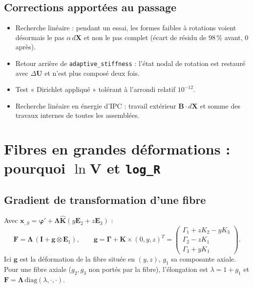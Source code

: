 \documentclass[11pt,a4paper]{article}
\newcommand{\hatv}[1]{\widehat{\bm{#1}}}
\newcommand{\Lam}{\bm{\Lambda}}
\newcommand{\Gam}{\bm{\Gamma}}
\newcommand{\Kv}{\mathbf{K}}
\newcommand{\code}[1]{\texttt{#1}}
\begin{document}
\subsection{Corrections apportées au passage}
\begin{itemize}
\item Recherche linéaire : pendant un essai, les formes faibles à rotations
voient désormais le pas $\alpha\,d\mathbf X$ et non le pas complet
(écart de résidu de 98\,\% avant, 0 après).
\item Retour arrière de \code{adaptive\_stiffness} : l'état nodal de rotation est
restauré avec $\Delta\mathbf U$ et n'est plus composé deux fois.
\item Test « Dirichlet appliqué » tolérant à l'arrondi relatif $10^{-12}$.
\item Recherche linéaire en énergie d'IPC : travail extérieur
$\mathbf B\cdot d\mathbf X$ et somme des travaux internes de toutes les
assemblées.
\end{itemize}

\section{Fibres en grandes déformations : pourquoi $\ln\mathbf V$ et \code{log\_R}}
\label{sec:fibres}

\subsection{Gradient de transformation d'une fibre}
Avec $\mathbf x_{,S}=\bm\varphi'+\Lam\hatv K(y\mathbf E_2+z\mathbf E_3)$ :
\begin{equation}
\mathbf F=\Lam\,(\mathbf I+\mathbf g\otimes\mathbf E_1),\qquad
\mathbf g=\Gam+\Kv\times(0,y,z)^T=
\begin{pmatrix}\Gamma_1+zK_2-yK_3\\ \Gamma_2-zK_1\\ \Gamma_3+yK_1\end{pmatrix}.
\end{equation}
Ici $\mathbf g$ est la déformation de la fibre située en $(y,z)$, $g_1$ sa
composante axiale. Pour une fibre axiale ($g_2,g_3$ non portés par la fibre),
l'élongation est $\lambda=1+g_1$ et
$\mathbf F=\Lam\,\mathrm{diag}(\lambda,\cdot,\cdot)$.
\end{document}
